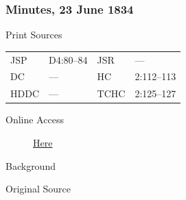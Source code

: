 		\subsubsection{Minutes, 23 June 1834}
			\label{EMS-1834-JS-23-JUN-1834}
			
			\begin{description}
					\item[Print Sources]
				\end{description}

					\begin{tabular}{p{0.5in}p{1in}p{0.5in}p{1in}}
					JSP	 	& D4:80--84		& JSR 		& --- \\
					DC	 	& --- 		& HC 		& 2:112--113 \\
					HDDC 	& ---		& TCHC 		& 2:125--127 \\
					\end{tabular}
				
				\begin{description}
					\item[Online Access] \href{https://www.josephsmithpapers.org/paper-summary/minutes-23-june-1834/1}{Here}
				\end{description}
				
				\begin{description}
					\item[Background]
				\end{description}
				
				
				\begin{description}
					\item[Original Source]
				\end{description}
				
				
